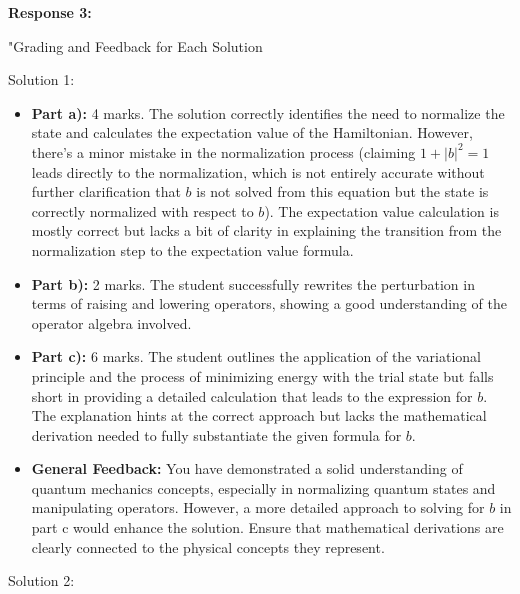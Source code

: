 \documentclass[a4paper,11pt]{article}
\begin{document}
\textbf{Response 3:}

"Grading and Feedback for Each Solution

Solution 1:

\begin{itemize}
    \item \textbf{Part a):} 4 marks. The solution correctly identifies the need to normalize the state and calculates the expectation value of the Hamiltonian. However, there's a minor mistake in the normalization process (claiming \(1 + |b|^2 = 1\) leads directly to the normalization, which is not entirely accurate without further clarification that \(b\) is not solved from this equation but the state is correctly normalized with respect to \(b\)). The expectation value calculation is mostly correct but lacks a bit of clarity in explaining the transition from the normalization step to the expectation value formula.
    \item \textbf{Part b):} 2 marks. The student successfully rewrites the perturbation in terms of raising and lowering operators, showing a good understanding of the operator algebra involved.
    \item \textbf{Part c):} 6 marks. The student outlines the application of the variational principle and the process of minimizing energy with the trial state but falls short in providing a detailed calculation that leads to the expression for \(b\). The explanation hints at the correct approach but lacks the mathematical derivation needed to fully substantiate the given formula for \(b\).
    \item \textbf{General Feedback:} You have demonstrated a solid understanding of quantum mechanics concepts, especially in normalizing quantum states and manipulating operators. However, a more detailed approach to solving for \(b\) in part c would enhance the solution. Ensure that mathematical derivations are clearly connected to the physical concepts they represent.
\end{itemize}

Solution 2:
\end{document}
